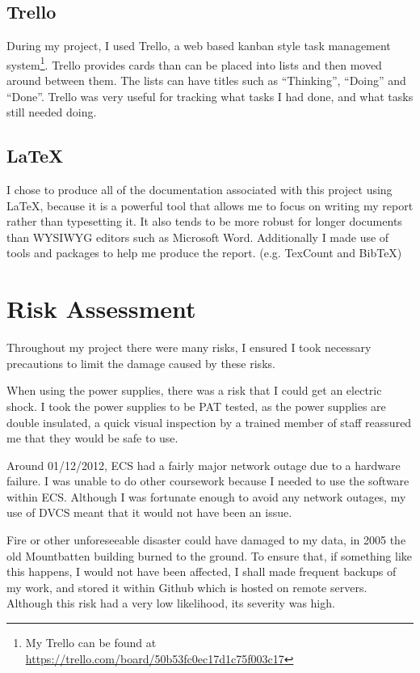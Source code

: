 \documentclass[12pt]{report}
\begin{document}
\subsection{Trello}
During my project, I used Trello, a web based kanban style task
management system\footnote{My Trello can be found at
\url{https://trello.com/board/50b53fc0ec17d1c75f003c17}}.
Trello provides cards than can be placed into lists and then moved around
between them. The lists can have titles such as ``Thinking'', ``Doing'' and
``Done''. Trello was very useful for tracking what tasks I had done, and what
tasks still needed doing. 

\subsection{\LaTeX}
I chose to produce all of the documentation associated with this project using
\LaTeX, because it is a powerful tool that allows me to focus on writing my
report rather than typesetting it. It also tends to be more robust for longer
documents than WYSIWYG editors such as Microsoft Word. Additionally I made use
of tools and packages to help me produce the report. (e.g. TexCount and BibTeX)

\section{Risk Assessment}
Throughout my project there were many risks, I ensured I took necessary
precautions to limit the damage caused by these risks.

When using the power supplies, there was a risk that I could get an electric
shock. I took the power supplies to be PAT tested, as the power supplies are
double insulated, a quick visual inspection by a trained member of staff
reassured me that they would be safe to use.

Around 01/12/2012, ECS had a fairly major network outage due to a hardware
failure. I was unable to do other coursework because I needed to use the
software within ECS\@. Although I was fortunate enough to avoid any network
outages, my use of DVCS meant that it would not have been an issue.

Fire or other unforeseeable disaster could have damaged to my data, in 2005 the old
Mountbatten building burned to the ground. To ensure that, if something like
this happens, I would not have been affected, I shall made frequent backups of
my work, and stored it within Github which is hosted on remote servers.
Although this risk had a very low likelihood, its severity was high.
\end{document}
